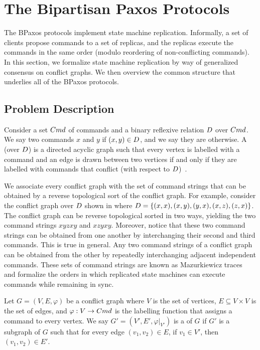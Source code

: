 \section{The Bipartisan Paxos Protocols}
The BPaxos protocols implement state machine replication. Informally, a set of
clients propose commands to a set of replicas, and the replicas execute the
commands in the same order (modulo reordering of non-conflicting commands). In
this section, we formalize state machine replication by way of generalized
consensus on conflict graphs. We then overview the common structure that
underlies all of the BPaxos protocols.

\subsection{Problem Description}
{}

Consider a set $Cmd$ of commands and a binary reflexive relation $D$
over $Cmd$. We say two commands $x$ and $y$  if $(x, y) \in
D$, and we say they are  otherwise. A
 (over $D$) is a directed acyclic graph such
that every vertex is labelled with a command and an edge is drawn between two
vertices if and only if they are labelled with commands that conflict (with
respect to $D$)~\cite{mazurkiewicz1995introduction}.

We associate every conflict graph with the set of command strings that can be
obtained by a reverse topological sort of the conflict graph. For example,
consider the conflict graph over $D$ shown in
 where
  $D = \{(x, x), (x, y), (y, x), (x, z), (z, x)\}$.
The conflict graph can be reverse topological sorted in two ways, yielding the
two command strings $xyzxy$ and $xzyxy$. Moreover, notice that these two
command strings can be obtained from one another by interchanging their second
and third commands. This is true in general. Any two command strings of a
conflict graph can be obtained from the other by repeatedly interchanging
adjacent independent commands. These sets of command strings are known as
Mazurkiewicz traces~\cite{mazurkiewicz1985semantics,
mazurkiewicz1995introduction} and formalize the orders in which replicated
state machines can execute commands while remaining in sync.

Let $G = (V, E, \varphi)$ be a conflict graph where $V$ is the set of vertices,
$E \subseteq V \times V$ is the set of edges, and $\varphi: V \to Cmd$ is the
labelling function that assigns a command to every vertex. We say $G' = (V',
E', \varphi|_{V'})$ is a  of $G$ if $G'$ is a subgraph of $G$
such that for every edge $(v_1, v_2) \in E$, if $v_1 \in V'$, then $(v_1, v_2)
\in E'$.

